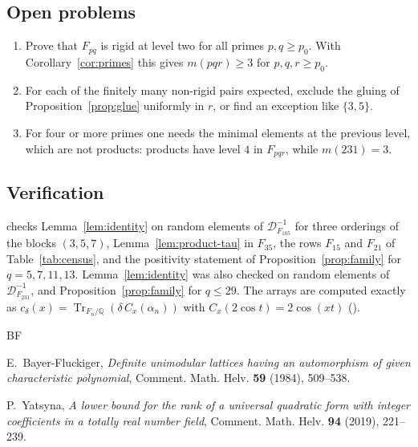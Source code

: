 \documentclass[11pt]{amsart}
\newcommand{\Q}{\mathbb{Q}}
\newcommand{\cod}[1]{\mathcal{D}_{#1}^{-1}}
\DeclareMathOperator{\Tr}{Tr}
\theoremstyle{plain}
\theoremstyle{definition}
\begin{document}
\subsection{Open problems}\label{sec:open}
\begin{enumerate}
\item Prove that $F_{pq}$ is rigid at level two for all primes $p, q \geq p_0$. With
  Corollary~\ref{cor:primes} this gives $m(pqr) \geq 3$ for $p, q, r \geq p_0$.
\item For each of the finitely many non-rigid pairs expected, exclude the gluing of
  Proposition~\ref{prop:glue} uniformly in $r$, or find an exception like $\{3,5\}$.
\item For four or more primes one needs the minimal elements at the previous level, which are not
  products: products have level $4$ in $F_{pqr}$, while $m(231) = 3$.
\end{enumerate}

\subsection{Verification}\label{sec:verification}
 checks Lemma~\ref{lem:identity} on random elements of
$\cod{F_{105}}$ for three orderings of the blocks $(3,5,7)$, Lemma~\ref{lem:product-tau} in
$F_{35}$, the rows $F_{15}$ and $F_{21}$ of Table~\ref{tab:census}, and the positivity statement of
Proposition~\ref{prop:family} for $q = 5, 7, 11, 13$. Lemma~\ref{lem:identity} was also checked
on random elements of $\cod{F_{231}}$, and Proposition~\ref{prop:family} for $q \leq 29$. The
arrays are computed exactly as $c_\delta(x) = \Tr_{F_n/\Q}(\delta\,C_x(\alpha_n))$ with
$C_x(2\cos t) = 2\cos(xt)$ ().

\begin{thebibliography}{BF}

E.~Bayer-Fluckiger, \emph{Definite unimodular lattices having an automorphism of given
characteristic polynomial}, Comment. Math. Helv. \textbf{59} (1984), 509--538.

P.~Yatsyna, \emph{A lower bound for the rank of a universal quadratic form with integer
coefficients in a totally real number field}, Comment. Math. Helv. \textbf{94} (2019),
221--239.

\end{thebibliography}
\end{document}
